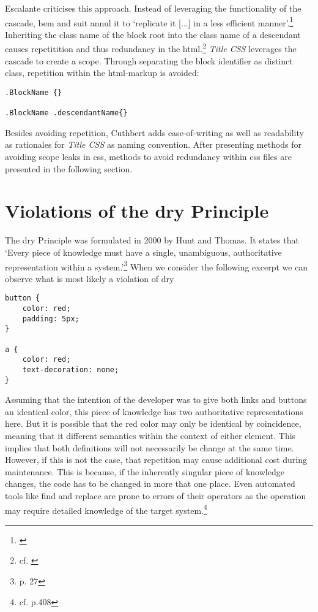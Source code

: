 Escalante criticises this approach.
Instead of leveraging the functionality of the cascade, \gls{bem} and \gls{suit} annul it to `replicate it [...] in a less efficient manner'.\footnote{\cite{mpgcss}}
Inheriting the class name of the block root into the class name of a descendant causes repetitition and thus redundancy in the \gls{html}.\footnote{cf. \cite{mpgcss}}
{\slshape Title CSS} leverages the cascade to create a scope.
Through separating the block identifier as distinct class, repetition within the \gls{html}-markup is avoided:

\begin{verbatim}
.BlockName {}

.BlockName .descendantName{}
\end{verbatim}
Besides avoiding repetition, Cuthbert adds ease-of-writing as well as readability as rationales for {\slshape Title CSS} as naming convention.
After presenting methods for avoiding scope leaks in \gls{css}, methods to avoid redundancy within \gls{css} files are presented in the following section.



\section{Violations of the \acrlong{dry} Principle}
The \gls{dry} Principle was formulated in 2000 by Hunt and Thomas.
It states that 
`Every piece of knowledge must have a single, unambiguous, authoritative representation within a system.'\footnote{\cite{pragmaticprogrammer} p. 27}
When we consider the following excerpt we can observe what is most likely a violation of \gls{dry}

\begin{verbatim}
button {
    color: red;
    padding: 5px;
}

a {
    color: red;
    text-decoration: none;
}
\end{verbatim}

Assuming that the intention of the developer was to give both links and buttons an identical color, this piece of knowledge has two authoritative representations here.
But it is possible that the red color may only be identical by coincidence, meaning that it different semantics within the context of either element.
This implies that both definitions will not necessarily be change at the same time.
However, if this is not the case, that repetition may cause additional cost during maintenance.
This is because, if the inherently singular piece of knowledge changes, the code has to be changed in more that one place.
Even automated tools like find and replace are prone to errors of their operators as the operation may require detailed knowledge of the target system.\footnote{cf. \cite{humanautomation} p.408}

